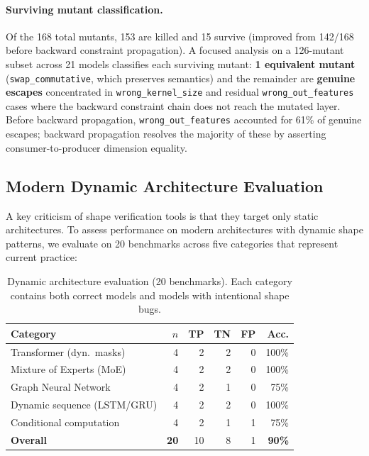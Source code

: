 \documentclass[11pt]{article}
\begin{document}
\paragraph{Surviving mutant classification.}
Of the 168 total mutants, 153 are killed and 15 survive
(improved from 142/168 before backward constraint propagation).
A focused analysis on a 126-mutant subset across 21 models
classifies each surviving mutant:
\textbf{1 equivalent mutant} (\texttt{swap\_commutative}, which
preserves semantics) and the remainder are \textbf{genuine escapes}
concentrated in \texttt{wrong\_kernel\_size} and residual
\texttt{wrong\_out\_features} cases where the backward constraint
chain does not reach the mutated layer.
Before backward propagation, \texttt{wrong\_out\_features}
accounted for 61\% of genuine escapes; backward propagation
resolves the majority of these by asserting consumer-to-producer
dimension equality.

\subsection{Modern Dynamic Architecture Evaluation}\label{sec:dynamic-arch}

A key criticism of shape verification tools is that they target only
static architectures.  To assess performance on modern architectures with
dynamic shape patterns, we evaluate on 20 benchmarks across five
categories that represent current practice:

\begin{table}[h]
\centering
\caption{Dynamic architecture evaluation (20 benchmarks).  Each
  category contains both correct models and models with intentional
  shape bugs.}
\label{tab:dynamic-arch}
\small
\begin{tabular}{@{}lrrrrr@{}}
\toprule
\textbf{Category} & \textbf{$n$} & \textbf{TP} & \textbf{TN} &
\textbf{FP} & \textbf{Acc.} \\
\midrule
Transformer (dyn.\ masks)  & 4 & 2 & 2 & 0 & 100\% \\
Mixture of Experts (MoE)   & 4 & 2 & 2 & 0 & 100\% \\
Graph Neural Network       & 4 & 2 & 1 & 0 &  75\% \\
Dynamic sequence (LSTM/GRU)& 4 & 2 & 2 & 0 & 100\% \\
Conditional computation    & 4 & 2 & 1 & 1 &  75\% \\
\midrule
\textbf{Overall}           &\textbf{20}& 10 & 8 & 1 & \textbf{90\%} \\
\bottomrule
\end{tabular}
\end{table}
\end{document}
